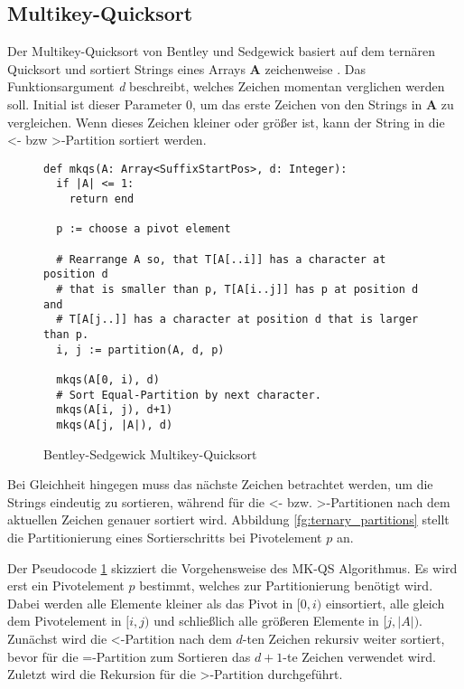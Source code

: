 \subsection{Multikey-Quicksort}
\label{section:mkqs}
Der  Multikey-Quicksort von
Bentley und Sedgewick basiert auf dem ternären Quicksort und sortiert Strings eines Arrays \textbf{A}
zeichenweise \cite{multikey_quicksort}. Das Funktionsargument \textit{d} beschreibt,
welches Zeichen momentan verglichen werden soll. Initial ist dieser Parameter 0,
um das erste Zeichen von den Strings in \textbf{A} zu vergleichen.
Wenn dieses Zeichen kleiner oder größer ist,
kann der String in die \glqq <\grqq- bzw \glqq >\grqq-Partition sortiert werden.

\begin{figure}
	\begin{verbatim}
def mkqs(A: Array<SuffixStartPos>, d: Integer):
  if |A| <= 1:
    return end

  p := choose a pivot element

  # Rearrange A so, that T[A[..i]] has a character at position d
  # that is smaller than p, T[A[i..j]] has p at position d and 
  # T[A[j..]] has a character at position d that is larger than p.
  i, j := partition(A, d, p)

  mkqs(A[0, i), d)
  # Sort Equal-Partition by next character.
  mkqs(A[i, j), d+1)
  mkqs(A[j, |A|), d)
	\end{verbatim}
	\caption{Bentley-Sedgewick Multikey-Quicksort~\cite{multikey_quicksort}}
	\label{alg:mkqs}
\end{figure}

Bei Gleichheit hingegen muss das nächste Zeichen betrachtet werden, um die Strings eindeutig zu sortieren,
während für die \glqq <\grqq- bzw. \glqq >\grqq-Partitionen nach dem aktuellen Zeichen genauer sortiert wird.
Abbildung \ref{fg:ternary_partitions} stellt die Partitionierung eines Sortierschritts bei Pivotelement $p$ an.

Der Pseudocode \ref{alg:mkqs} skizziert die Vorgehensweise des MK-QS Algorithmus.
Es wird erst ein Pivotelement $p$ bestimmt, welches zur Partitionierung benötigt wird.
Dabei werden alle Elemente kleiner als das Pivot in $[0, i)$ einsortiert,
alle gleich dem Pivotelement in $[i, j)$ und schließlich alle größeren Elemente in $[j, |A|)$.
Zunächst wird die \glqq <\grqq-Partition nach dem $d$-ten Zeichen rekursiv weiter sortiert,
bevor für die \glqq =\grqq-Partition zum Sortieren das $d+1$-te Zeichen verwendet wird.
Zuletzt wird die Rekursion für die \glqq >\grqq-Partition durchgeführt.

